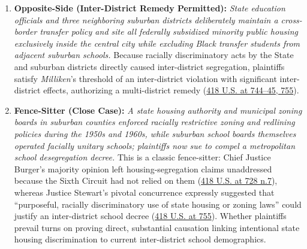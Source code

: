 \documentclass[12pt]{article}
\begin{document}
\begin{enumerate}
\item \textbf{Opposite-Side (Inter-District Remedy Permitted):} \textit{State education officials and three neighboring suburban districts deliberately maintain a cross-border transfer policy and site all federally subsidized minority public housing exclusively inside the central city while excluding Black transfer students from adjacent suburban schools.} Because racially discriminatory acts by the State and suburban districts directly caused inter-district segregation, plaintiffs satisfy \textit{Milliken}'s threshold of an inter-district violation with significant inter-district effects, authorizing a multi-district remedy (\href{https://supreme.justia.com/cases/federal/us/418/717/}{418 U.S. at 744--45, 755}).

\item \textbf{Fence-Sitter (Close Case):} \textit{A state housing authority and municipal zoning boards in suburban counties enforced racially restrictive zoning and redlining policies during the 1950s and 1960s, while suburban school boards themselves operated facially unitary schools; plaintiffs now sue to compel a metropolitan school desegregation decree.} This is a classic fence-sitter: Chief Justice Burger's majority opinion left housing-segregation claims unaddressed because the Sixth Circuit had not relied on them (\href{https://supreme.justia.com/cases/federal/us/418/717/}{418 U.S. at 728 n.7}), whereas Justice Stewart's pivotal concurrence expressly suggested that ``purposeful, racially discriminatory use of state housing or zoning laws'' could justify an inter-district school decree (\href{https://supreme.justia.com/cases/federal/us/418/717/}{418 U.S. at 755}). Whether plaintiffs prevail turns on proving direct, substantial causation linking intentional state housing discrimination to current inter-district school demographics.
\end{enumerate}
\end{document}
